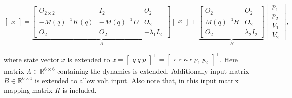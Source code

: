 \begin{equation}
     \begin{bmatrix} \dot{x}  \end{bmatrix}   =   \underbrace{ \begin{bmatrix} O_{2\times 2} & I_{2} & O_{2} \\ -M(q)^{-1}K(q)  & -M(q)^{-1} D & O_{2} \\
     O_{2} & O_{2}    & -\lambda_1 I_{2}\ \end{bmatrix}   }_A   \begin{bmatrix} x \end{bmatrix}  + \underbrace{      \begin{bmatrix} O_{2} & O_{2} \\ M(q)^{-1}H & O_{2} \\ O_{2} & \lambda_2 I_{2} \end{bmatrix} }_B      \begin{bmatrix} p_1 \\ p_2  \\ V_1 \\ V_2 \end{bmatrix},
     \label{eq:ssp}
\end{equation}

where state vector $x$ is extended to $x = \begin{bmatrix} q \hspace{3pt} \dot{q} \hspace{3pt} p \end{bmatrix}^\top = \begin{bmatrix} \kappa \hspace{3pt} \epsilon \hspace{3pt} \dot{\kappa} \hspace{3pt} \dot{\epsilon} \hspace{3pt} p_1 \hspace{3pt} p_2 \end{bmatrix}^\top$.  Here matrix $A \in \mathbb{R}^{6\times 6}$ containing the dynamics is extended. Additionally input matrix $B \in \mathbb{R}^{6\times 4}$ is extended to allow volt input. Also note that, in this input matrix mapping matrix $H$ is included.







